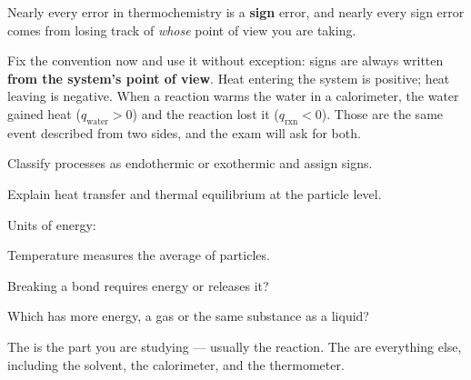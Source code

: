 \documentclass{apchem-notes}
\begin{document}
\apctitleblock

\begin{apcnote}
Nearly every error in thermochemistry is a \textbf{sign} error, and nearly
every sign error comes from losing track of \emph{whose} point of view you
are taking.

Fix the convention now and use it without exception: signs are always
written \textbf{from the system's point of view}. Heat entering the system
is positive; heat leaving is negative. When a reaction warms the water in a
calorimeter, the water gained heat ($q_{\text{water}} > 0$) and the reaction
lost it ($q_{\text{rxn}} < 0$). Those are the same event described from two
sides, and the exam will ask for both.
\end{apcnote}


\begin{objectives}
  \item Classify processes as endothermic or exothermic and assign signs.
  \item Explain heat transfer and thermal equilibrium at the particle level.
\end{objectives}


\begin{warmup}[4]
  \item Units of energy: 
  \item Temperature measures the average
         of particles.
  \item Breaking a bond requires energy or releases it?
  \item Which has more energy, a gas or the same substance as a liquid?
\end{warmup}



The  is the part you are studying --- usually the reaction. The
 are everything else, including the solvent, the
calorimeter, and the thermometer.
\end{document}
